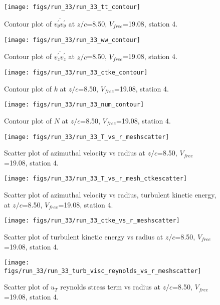 \begin{figure}[H]
\centering
\texttt{[image: figs/run\_33/run\_33\_tt\_contour]}
\caption{Contour plot of $\overline{v_{\theta}^{\prime} v_{\theta}^{\prime}}$ at $z/c$=8.50, $V_{free}$=19.08, station 4.}
\end{figure}


\begin{figure}[H]
\centering
\texttt{[image: figs/run\_33/run\_33\_ww\_contour]}
\caption{Contour plot of $\overline{v_{z}^{\prime} v_{z}^{\prime}}$ at $z/c$=8.50, $V_{free}$=19.08, station 4.}
\end{figure}


\begin{figure}[H]
\centering
\texttt{[image: figs/run\_33/run\_33\_ctke\_contour]}
\caption{Contour plot of $k$ at $z/c$=8.50, $V_{free}$=19.08, station 4.}
\end{figure}


\begin{figure}[H]
\centering
\texttt{[image: figs/run\_33/run\_33\_num\_contour]}
\caption{Contour plot of $N$ at $z/c$=8.50, $V_{free}$=19.08, station 4.}
\end{figure}


\begin{figure}[H]
\centering
\texttt{[image: figs/run\_33/run\_33\_T\_vs\_r\_meshscatter]}
\caption{Scatter plot of azimuthal velocity vs radius at $z/c$=8.50, $V_{free}$=19.08, station 4.}
\end{figure}


\begin{figure}[H]
\centering
\texttt{[image: figs/run\_33/run\_33\_T\_vs\_r\_mesh\_ctkescatter]}
\caption{Scatter plot of azimuthal velocity vs radius, turbulent kinetic energy, at $z/c$=8.50, $V_{free}$=19.08, station 4.}
\end{figure}


\begin{figure}[H]
\centering
\texttt{[image: figs/run\_33/run\_33\_ctke\_vs\_r\_meshscatter]}
\caption{Scatter plot of turbulent kinetic energy vs radius at $z/c$=8.50, $V_{free}$=19.08, station 4.}
\end{figure}


\begin{figure}[H]
\centering
\texttt{[image: figs/run\_33/run\_33\_turb\_visc\_reynolds\_vs\_r\_meshscatter]}
\caption{Scatter plot of $
u_T$ reynolds stress term vs radius at $z/c$=8.50, $V_{free}$=19.08, station 4.}
\end{figure}


